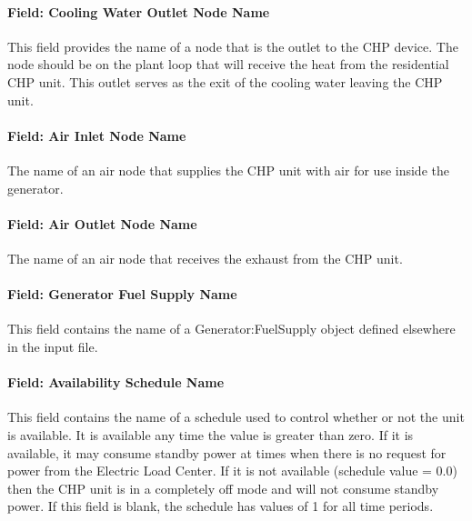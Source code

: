 \paragraph{Field: Cooling Water Outlet Node Name}\label{field-cooling-water-outlet-node-name}

This field provides the name of a node that is the outlet to the CHP device. The node should be on the plant loop that will receive the heat from the residential CHP unit. This outlet serves as the exit of the cooling water leaving the CHP unit.

\paragraph{Field: Air Inlet Node Name}\label{field-air-inlet-node-name-000}

The name of an air node that supplies the CHP unit with air for use inside the generator.

\paragraph{Field: Air Outlet Node Name}\label{field-air-outlet-node-name-000}

The name of an air node that receives the exhaust from the CHP unit.

\paragraph{Field: Generator Fuel Supply Name}\label{field-generator-fuel-supply-name}

This field contains the name of a Generator:FuelSupply object defined elsewhere in the input file.

\paragraph{Field: Availability Schedule Name}\label{field-availability-schedule-name-7-000}

This field contains the name of a schedule used to control whether or not the unit is available. It is available any time the value is greater than zero. If it is available, it may consume standby power at times when there is no request for power from the Electric Load Center. If it is not available (schedule value = 0.0) then the CHP unit is in a completely off mode and will not consume standby power. If this field is blank, the schedule has values of 1 for all time periods.

